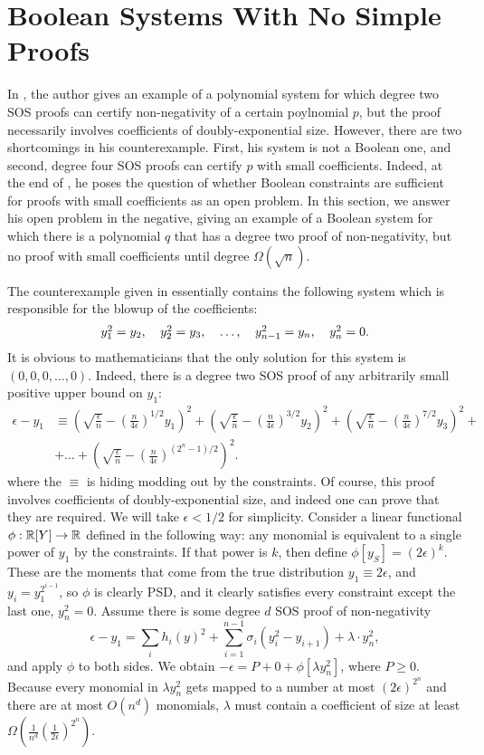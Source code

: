 \section{Boolean Systems With No Simple Proofs}
In \cite{odonnel}, the author gives an example of a polynomial system for which degree two SOS proofs can certify non-negativity of a certain poylnomial $p$, but the proof necessarily involves coefficients of doubly-exponential size. However, there are two shortcomings in his counterexample. First, his system is not a Boolean one, and second, degree four SOS proofs can certify $p$ with small coefficients. Indeed, at the end of \cite{odonnel}, he poses the question of whether Boolean constraints are sufficient for proofs with small coefficients as an open problem. In this section, we answer his open problem in the negative, giving an example of a Boolean system for which there is a polynomial $q$ that has a degree two proof of non-negativity, but no proof with small coefficients until degree $\Omega(\sqrt{n})$.

The counterexample given in \cite{odonnel} essentially contains the following system which is responsible for the blowup of the coefficients:
\[\begin{tabular}{ccccc}
$y_1^2 = y_2$, & $y_2^2 = y_3$, & $\dots$, & $y_{n-1}^2 = y_n$, & $y_n^2 = 0$.
\end{tabular}\]
It is obvious to mathematicians that the only solution for this system is $(0,0,0,\dots,0)$. Indeed, there is a degree two SOS proof of any arbitrarily small positive upper bound on $y_1$:
\begin{align*}
\epsilon - y_1 &\equiv \left(\sqrt{\frac{\epsilon}{n}} - \left(\frac{n}{4\epsilon}\right)^{1/2}y_1\right)^2 + \left(\sqrt{\frac{\epsilon}{n}} - \left(\frac{n}{4\epsilon}\right)^{3/2}y_2\right)^2 + \left(\sqrt{\frac{\epsilon}{n}} - \left(\frac{n}{4\epsilon}\right)^{7/2}y_3\right)^2 + \\
&+\dots + \left(\sqrt{\frac{\epsilon}{n}} - \left(\frac{n}{4\epsilon}\right)^{(2^n-1)/2}\right)^2.
\end{align*}
where the $\equiv$ is hiding modding out by the constraints. Of course, this proof involves coefficients of doubly-exponential size, and indeed one can prove that they are required. We will take $\epsilon < 1/2$ for simplicity. Consider a linear functional $\phi: \mathbb R[Y] \rightarrow \mathbb R$ defined in the following way: any monomial is equivalent to a single power of $y_1$ by the constraints. If that power is $k$, then define $\phi[y_S] = (2\epsilon)^k$. These are the moments that come from the true distribution $y_1 \equiv 2\epsilon$, and $y_i = y_1^{2^{i-1}}$, so $\phi$ is clearly PSD, and it clearly satisfies every constraint except the last one, $y_n^2 = 0$. Assume there is some degree $d$ SOS proof of non-negativity
\[\epsilon - y_1 = \sum_i h_i(y)^2 + \sum_{i=1}^{n-1} \sigma_i(y_i^2 - y_{i+1}) + \lambda \cdot y_n^2,\]
and apply $\phi$ to both sides. We obtain $-\epsilon = P + 0 + \phi[\lambda y_n^2]$, where $P \geq 0$. Because every monomial in $\lambda y_n^2$ gets mapped to a number at most $(2\epsilon)^{2^n}$ and there are at most $O(n^d)$ monomials, $\lambda$ must contain a coefficient of size at least $\Omega(\frac{1}{n^d}\left(\frac{1}{2\epsilon}\right)^{2^n})$. 

